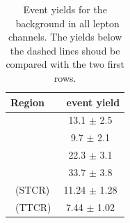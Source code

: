 	
	\begin{table}[htbp]
		\begin{center}
						\caption{Event yields for the \ttbar\ background in all lepton channels. The yields below the dashed lines shoud be compared with the two first rows. }
			
			\begin{tabular} {l c}
				\toprule
				Region & \ttbar\ event yield  \\ 
				\midrule 
				\STSR & 13.1 $\pm $ 2.5 \\
				\TTSR & 9.7 $\pm $ 2.1 \\
				\TTCR & 22.3 $\pm $ 3.1 \\
				\STCR & 33.7 $\pm $ 3.8 \B\\
				\hdashline
				\STSR\ (STCR)& 11.24 $\pm $ 1.28\T \\  				 
				\TTSR\ (TTCR) & 7.44 $\pm $ 1.02  \\
				\bottomrule
			\end{tabular}

		\end{center}
	\label{tab:applied}
	\end{table}
\clearpage
